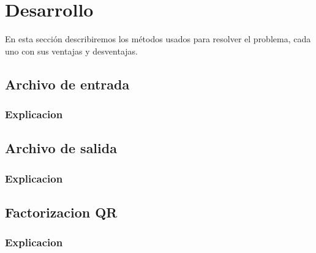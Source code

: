 \section{Desarrollo}
En esta sección describiremos los métodos usados para resolver el problema, cada uno con sus
ventajas y desventajas.

\subsection{Archivo de entrada}
\subsubsection{Explicacion}

\subsection{Archivo de salida}
\subsubsection{Explicacion}


\subsection{Factorizacion QR}
\subsubsection{Explicacion}







